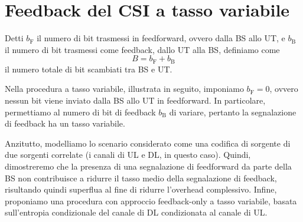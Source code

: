 \chapter{Feedback del CSI a tasso variabile}

\thispagestyle{empty}

Detti \(b_\mathrm{F}\) il numero di bit trasmessi in feedforward, ovvero dalla
BS allo UT, e \(b_\mathrm{B}\) il numero di bit trasmessi come feedback, dallo
UT alla BS, definiamo come
\[
    B = b_\mathrm{F} + b_\mathrm{B}
\]
il numero totale di bit scambiati tra BS e UT.

Nella procedura a tasso variabile, illustrata in seguito, imponiamo
\(b_\mathrm{F} = 0\), ovvero nessun bit viene inviato dalla BS allo UT in
feedforward. In particolare, permettiamo al numero di bit di feedback
\(b_\mathrm{B}\) di variare, pertanto la segnalazione di feedback ha un tasso
variabile.

Anzitutto, modelliamo lo scenario considerato come una codifica di sorgente di
due sorgenti correlate (i canali di UL e DL, in questo caso).  Quindi,
dimostreremo che la presenza di una segnalazione di feedforward da parte della
BS non contribuisce a ridurre il tasso medio della segnalazione di feedback,
risultando quindi superflua al fine di ridurre l'overhead complessivo. Infine,
proponiamo una procedura con approccio feedback-only a tasso variabile, basata
sull'entropia condizionale del canale di DL condizionata al canale di UL.

\lipsum[4]  %






